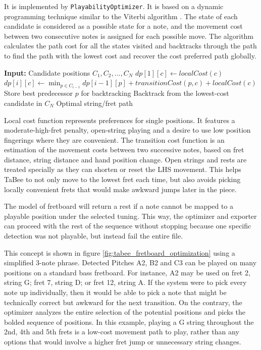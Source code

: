 \documentclass[a4paper, 12pt, titlepage]{article}
\begin{document}
It is implemented by \texttt{PlayabilityOptimizer}. It is based on a dynamic programming technique similar to the Viterbi algorithm \cite{forney1973}. The state of each candidate is considered as a possible state for a note, and the movement cost between two consecutive notes is assigned for each possible move. The algorithm calculates the path cost for all the states visited and backtracks through the path to find the path with the lowest cost and recover the cost preferred path globally.

\begin{algorithm}[H]
    \caption{Playability-Based Fretboard Optimization}
    \label{alg:tabee_playability_optimizer}
    \begin{algorithmic}[1]
        \State \textbf{Input:} Candidate positions $C_1, C_2, ..., C_N$
            \State $dp[1][c] \gets localCost(c)$
        \EndFor
                \State $dp[i][c] \gets \min_{p \in C_{i-1}} dp[i-1][p] + transitionCost(p,c) + localCost(c)$
                \State Store best predecessor $p$ for backtracking
            \EndFor
        \EndFor
        \State Backtrack from the lowest-cost candidate in $C_N$
        \State \Return Optimal string/fret path
    \end{algorithmic}
\end{algorithm}

Local cost function represents preferences for single positions. It features a moderate-high-fret penalty, open-string playing and a desire to use low position fingerings where they are convenient. The transition cost function is an estimation of the movement costs between two successive notes, based on fret distance, string distance and hand position change. Open strings and rests are treated specially as they can shorten or reset the LHS movement. This helps TaBee to not only move to the lowest fret each time, but also avoids picking locally convenient frets that would make awkward jumps later in the piece.

The model of fretboard will return a rest if a note cannot be mapped to a playable position under the selected tuning. This way, the optimizer and exporter can proceed with the rest of the sequence without stopping because one specific detection was not playable, but instead fail the entire file.

This concept is shown in figure \ref{fig:tabee_fretboard_optimization} using a simplified 3-note phrase. Detected Pitches A2, B2 and C3 can be played on many positions on a standard bass fretboard. For instance, A2 may be used on fret 2, string G; fret 7, string D; or fret 12, string A. If the system were to pick every note up individually, then it would be able to pick a note that might be technically correct but awkward for the next transition. On the contrary, the optimizer analyzes the entire selection of the potential positions and picks the bolded sequence of positions. In this example, playing a G string throughout the 2nd, 4th and 5th frets is a low-cost movement path to play, rather than any options that would involve a higher fret jump or unnecessary string changes.
\end{document}
